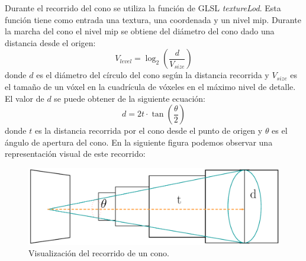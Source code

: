 Durante el recorrido del cono se utiliza la función de GLSL \emph{textureLod}. Esta función tiene como entrada una textura, una coordenada y un nivel mip. Durante la marcha del cono el nivel mip se obtiene del diámetro del cono dado una distancia desde el origen:
\begin{equation}
    V_{level} = \log_2\left(\frac{d}{V_{size}}\right)
\end{equation} donde $d$ es el diámetro del círculo del cono según la distancia recorrida y $V_{size}$ es el tamaño de un vóxel en la cuadrícula de vóxeles en el máximo nivel de detalle. El valor de $d$ se puede obtener de la siguiente ecuación:
\begin{equation}
    d = 2t\cdot\tan\left(\frac{\theta}{2}\right)
\end{equation} donde $t$ es la distancia recorrida por el cono desde el punto de origen y $\theta$ es el ángulo de apertura del cono. En la siguiente figura podemos observar una representación visual de este recorrido:
\begin{figure}[H]
    \centering
    \captionsetup{justification=centering}
    \includegraphics[width=.9\linewidth]{media/cone.pdf}
    \caption{Visualización del recorrido de un cono.}
\end{figure}

